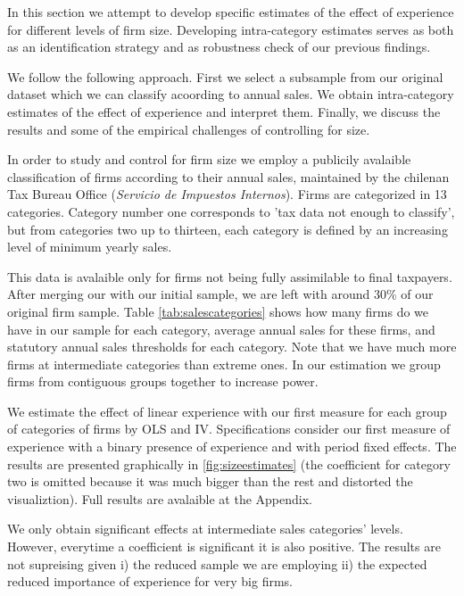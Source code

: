     In this section we attempt to develop specific estimates of the effect of experience for different levels of firm size. Developing intra-category estimates serves as both as an identification strategy and as  robustness check of our previous findings.

      We follow the following approach. First we select a subsample from our original dataset which we can classify acoording to annual sales.  We obtain intra-category estimates of the effect of experience and interpret them. Finally, we discuss the results and some of the empirical challenges of controlling for size.

     In order to study and control for firm size we employ a publicily avalaible classification of firms according to their annual sales, maintained by the chilenan Tax Bureau Office (\textit{Servicio de Impuestos Internos}). Firms are categorized in 13 categories. Category number one  corresponds to 'tax data not enough to classify', but from categories two up to thirteen, each category is defined by an increasing level of minimum yearly sales.

     This data is avalaible only for firms not being fully assimilable to final taxpayers. After merging our with our initial sample, we are left with around 30\% of our original firm sample. Table \ref{tab:salescategories} shows how many firms do we have in our sample for each category, average annual sales for these firms, and statutory annual sales thresholds for each category. Note that we have much more firms at intermediate categories than extreme ones. In our estimation we group firms from contiguous groups together to increase power.

     

     We estimate the effect of linear experience with our first measure for each group of categories of firms by OLS and IV. Specifications consider our first measure of experience with a binary presence of experience and with period fixed effects. The results are presented graphically in \ref{fig:sizeestimates} (the coefficient for category two is omitted because it was much bigger than the rest and distorted the visualiztion). Full results are avalaible at the Appendix.

     We only obtain significant effects at intermediate sales categories' levels. However, everytime a coefficient is significant it is also positive. The results are not supreising given i) the reduced sample we are employing ii) the expected reduced importance of experience for very big firms.

